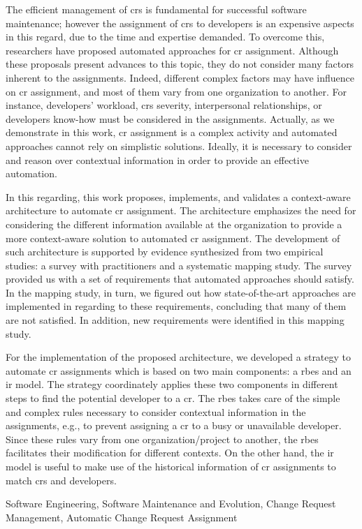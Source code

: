 The efficient management of \acp{cr} is fundamental for successful software
maintenance; however the assignment of \acp{cr} to developers is an expensive
aspects in this regard, due to the time and expertise demanded. To overcome
this, researchers have proposed automated approaches for \ac{cr} assignment.
Although these proposals present advances to this topic, they do not consider
many factors inherent to the assignments. Indeed, different complex factors may
have influence on \ac{cr} assignment, and most of them vary from one
organization to another. For instance, developers' workload, \acp{cr} severity,
interpersonal relationships, or developers know-how must be considered in the
assignments. Actually, as we demonstrate in this work, \ac{cr} assignment is a
complex activity and automated approaches cannot rely on simplistic solutions.
Ideally, it is necessary to consider and reason over contextual information in
order to provide an effective automation.

In this regarding, this work proposes, implements, and validates a context-aware
architecture to automate \ac{cr} assignment. The architecture emphasizes the
need for considering the different information available at the organization to
provide a more context-aware solution to automated \ac{cr} assignment. The
development of such architecture is supported by evidence synthesized from two
empirical studies: a survey with practitioners and a systematic mapping study.
The survey provided us with a set of requirements that automated approaches
should satisfy. In the mapping study, in turn, we figured out how
state-of-the-art approaches are implemented in regarding to these requirements,
concluding that many of them are not satisfied. In addition, new requirements
were identified in this mapping study.

For the implementation of the proposed architecture, we developed a strategy to
automate \ac{cr} assignments which is based on two main components: a \acf{rbes}
and an \acf{ir} model. The strategy coordinately applies these two components in
different steps to find the potential developer to a \ac{cr}. The \ac{rbes}
takes care of the simple and complex rules necessary to consider contextual
information in the assignments, e.g., to prevent assigning a \ac{cr} to a busy
or unavailable developer. Since these rules vary from one organization/project
to another, the \ac{rbes} facilitates their modification for different contexts.
On the other hand, the \ac{ir} model is useful to make use of the historical
information of \ac{cr} assignments to match \acp{cr} and developers.

\begin{keywords}
Software Engineering, Software Maintenance and Evolution, Change Request
Management, Automatic Change Request Assignment
\end{keywords}
